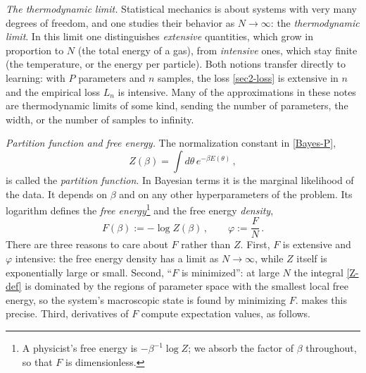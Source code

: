 \documentclass[11pt]{article}
\begin{document}
\emph{The thermodynamic limit.} Statistical mechanics is about systems with very many degrees of freedom, and one studies their behavior as $N\to\infty$: the \emph{thermodynamic limit}. In this limit one distinguishes \emph{extensive} quantities, which grow in proportion to $N$ (the total energy of a gas), from \emph{intensive} ones, which stay finite (the temperature, or the energy per particle). Both notions transfer directly to learning: with $P$ parameters and $n$ samples, the loss \eqref{sec2-loss} is extensive in $n$ and the empirical loss $L_n$ is intensive. Many of the approximations in these notes are thermodynamic limits of some kind, sending the number of parameters, the width, or the number of samples to infinity.

\emph{Partition function and free energy.} The normalization constant in \eqref{Bayes-P},
%
\begin{equation}
    Z(\beta) = \int d\theta\, e^{-\beta E(\theta)}\,, \label{Z-def}
\end{equation}
%
is called the \emph{partition function}. In Bayesian terms it is the marginal likelihood of the data. It depends on $\beta$ and on any other hyperparameters of the problem. Its logarithm defines the \emph{free energy}\footnote{A physicist's free energy is $-\beta^{-1}\log Z$; we absorb the factor of $\beta$ throughout, so that $F$ is dimensionless.} and the free energy \emph{density},
%
\begin{equation}
    F(\beta) := -\log Z(\beta)\,,\qquad \varphi := \frac{F}{N}\,. \label{F-def}
\end{equation}
%
There are three reasons to care about $F$ rather than $Z$. First, $F$ is extensive and $\varphi$ intensive: the free energy density has a limit as $N\to\infty$, while $Z$ itself is exponentially large or small. Second, ``$F$ is minimized'': at large $N$ the integral \eqref{Z-def} is dominated by the regions of parameter space with the smallest local free energy, so the system's macroscopic state is found by minimizing $F$.  makes this precise. Third, derivatives of $F$ compute expectation values, as follows.
\end{document}
